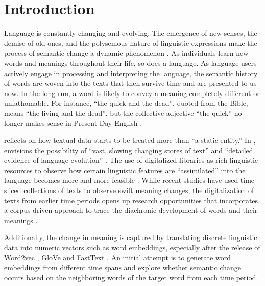 

\chapter{Introduction}
Language is constantly changing and evolving. The emergence of new senses, the demise of old ones, and the polysemous nature of linguistic expressions make the process of semantic change a dynamic phenomenon \parencite{robertinvanhove2008}. As individuals learn new words and meanings throughout their life, so does a language. As language users actively engage in processing and interpreting the language, the semantic history of words are woven into the texts that then survive time and are presented to us now. In the long run, a word is likely to convey a meaning completely different or unfathomable. For instance, ``the quick and the dead'', quoted from the Bible, means ``the living and the dead'', but the collective adjective ``the quick'' no longer makes sense in Present-Day English \parencite[199]{semanticincrowley2010}.

\textcite{renouf2002time} reflects on how textual data starts to be treated more than ``a static entity.'' In \cite*{sinclair1982reflections}, \citeauthor{sinclair1982reflections} envisions the possibility of ``vast, slowing changing stores of text'' and ``detailed evidence of language evolution'' . The use of digitalized libraries as rich linguistic resources to observe how certain linguistic features are ``assimilated'' into the language becomes more and more feasible \parencite{renouf2002time}. While recent studies have used time-sliced collections of texts to observe swift meaning changes, the digitalization of texts from earlier time periods opens up research opportunities that incorporates a corpus-driven approach to trace the diachronic development of words and their meanings \parencite{kutuzov2018survey,tahmasebi2018survey,camacho2018survey}.

Additionally, the change in meaning is captured by translating discrete linguistic data into numeric vectors such as word embeddings, especially after the release of Word2vec \parencite{mikolov2013efficient}, GloVe \parencite{pennington2014glove} and FastText \parencite{bojanowski2016enriching}. An initial attempt is to generate word embeddings from different time spans and explore whether semantic change occurs based on the neighboring words of the target word from each time period.

